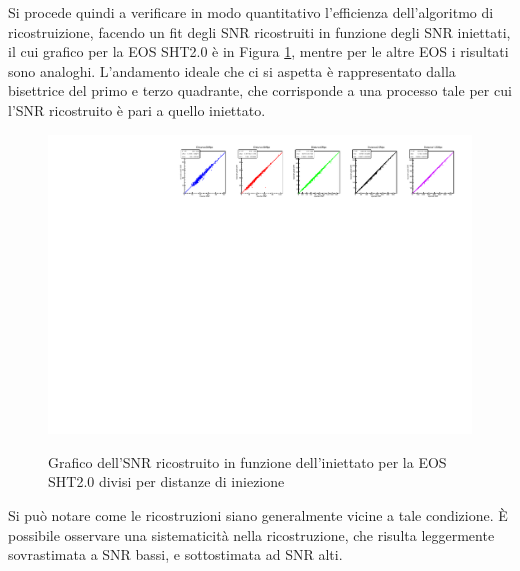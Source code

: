 Si procede quindi a verificare in modo quantitativo l'efficienza dell'algoritmo di ricostruizione, facendo un fit degli SNR ricostruiti in funzione degli SNR iniettati, il cui grafico per la EOS SHT2.0 è in Figura \ref{fig:overlap}, mentre per le altre EOS i risultati sono analoghi. L'andamento ideale che ci si aspetta è rappresentato dalla bisettrice del primo e terzo quadrante, che corrisponde a una processo tale per cui l'SNR ricostruito è pari a quello iniettato.
\begin{figure}[ht]
	\vspace{-5pt}
	\centering
	{\includegraphics[width=1\textwidth]{figures/Capitolo_3/report/FITSHT2_0spin1.pdf}}
	\vspace{-15pt}
	\caption{Grafico dell'SNR ricostruito in funzione dell'iniettato per la EOS SHT2.0 divisi per distanze di iniezione}
	\label{fig:overlap}
	\vspace{-15pt}
\end{figure}
Si può notare come le ricostruzioni siano generalmente vicine a tale condizione. È possibile osservare una sistematicità nella ricostruzione, che risulta leggermente sovrastimata a SNR bassi, e sottostimata ad SNR alti.

